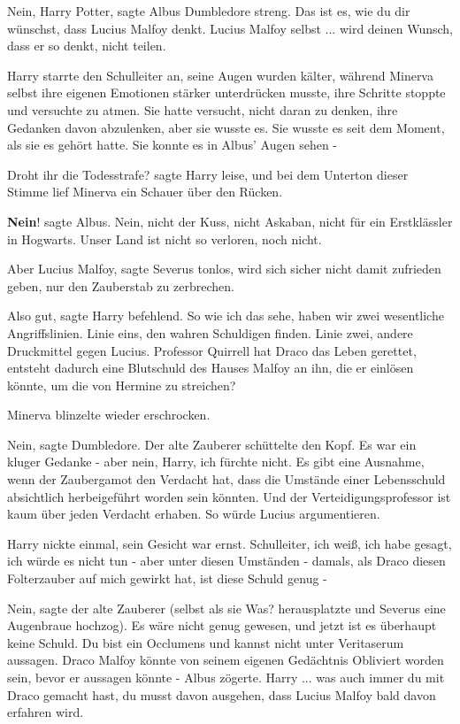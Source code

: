 \glqq Nein, Harry Potter\grqq{}, sagte Albus Dumbledore streng. \glqq Das ist
es, wie du dir wünschst, dass Lucius Malfoy denkt. Lucius Malfoy selbst ... wird
deinen Wunsch, dass er so denkt, nicht teilen.\grqq{}

Harry starrte den Schulleiter an, seine Augen wurden kälter, während Minerva
selbst ihre eigenen Emotionen stärker unterdrücken musste, ihre Schritte stoppte
und versuchte zu atmen. Sie hatte versucht, nicht daran zu denken, ihre Gedanken
davon abzulenken, aber sie wusste es. Sie wusste es seit dem Moment, als sie es
gehört hatte. Sie konnte es in Albus' Augen sehen -

\glqq Droht ihr die Todesstrafe?\grqq{} sagte Harry leise, und bei dem Unterton
dieser Stimme lief Minerva ein Schauer über den Rücken.

\glqq \textbf{Nein}!\grqq{} sagte Albus. \glqq Nein, nicht der Kuss, nicht
Askaban, nicht für ein Erstklässler in Hogwarts. Unser Land ist nicht so
verloren, noch nicht.\grqq{}

\glqq Aber Lucius Malfoy\grqq{}, sagte Severus tonlos, \glqq wird sich sicher
nicht damit zufrieden geben, nur den Zauberstab zu zerbrechen.\grqq{}

\glqq Also gut\grqq{}, sagte Harry befehlend. \glqq So wie ich das sehe, haben
wir zwei wesentliche Angriffslinien. Linie eins, den wahren Schuldigen finden.
Linie zwei, andere Druckmittel gegen Lucius. Professor Quirrell hat Draco das
Leben gerettet, entsteht dadurch eine Blutschuld des Hauses Malfoy an ihn, die
er einlösen könnte, um die von Hermine zu streichen?\grqq{}

Minerva blinzelte wieder erschrocken.

\glqq Nein\grqq{}, sagte Dumbledore. Der alte Zauberer schüttelte den Kopf.
\glqq Es war ein kluger Gedanke - aber nein, Harry, ich fürchte nicht. Es gibt
eine Ausnahme, wenn der Zaubergamot den Verdacht hat, dass die Umstände einer
Lebensschuld absichtlich herbeigeführt worden sein könnten. Und der
Verteidigungsprofessor ist kaum über jeden Verdacht erhaben. So würde Lucius
argumentieren.\grqq{}

Harry nickte einmal, sein Gesicht war ernst. \glqq Schulleiter, ich weiß, ich
habe gesagt, ich würde es nicht tun - aber unter diesen Umständen - damals, als
Draco diesen Folterzauber auf mich gewirkt hat, ist diese Schuld genug -\grqq{}

\glqq Nein\grqq{}, sagte der alte Zauberer (selbst als sie \glqq Was?\grqq{}
herausplatzte und Severus eine Augenbraue hochzog). \glqq Es wäre nicht genug
gewesen, und jetzt ist es überhaupt keine Schuld. Du bist ein Occlumens und
kannst nicht unter Veritaserum aussagen. Draco Malfoy könnte von seinem eigenen
Gedächtnis Obliviert worden sein, bevor er aussagen könnte -\grqq{} Albus
zögerte. \glqq Harry ... was auch immer du mit Draco gemacht hast, du musst
davon ausgehen, dass Lucius Malfoy bald davon erfahren wird.\grqq{}


